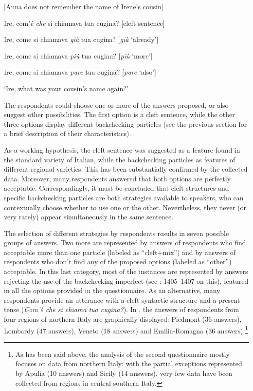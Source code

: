   [Anna does not remember the name of Irene’s cousin]

Ire, com’\textit{è che} si chiamava tua cugina?   [cleft sentence]

 Ire, come si chiamava \textit{già} tua cugina?    [\textit{già} ‘already’]

 Ire, come si chiamava \textit{più} tua cugina?   [\textit{più} ‘more’]

 Ire, come si chiamava \textit{pure} tua cugina?   [\textit{pure} ‘also’]

\glt ‘Ire, what was your cousin’s name again?’
    \z %

The respondents could choose one or more of the answers proposed, or also suggest other possibilities. The first option is a cleft sentence, while the other three options display different backchecking particles (see the previous section for a brief description of their characteristics).

As a working hypothesis, the cleft sentence was suggested as a feature found in the standard variety of Italian, while the backchecking particles as features of different regional varieties. This has been substantially confirmed by the collected data. Moreover, many respondents answered that both options are perfectly acceptable. Correspondingly, it must be concluded that cleft structures and specific backchecking particles are both strategies available to speakers, who can contextually choose whether to use one or the other. Nevertheless, they never (or very rarely) appear simultaneously in the same sentence.

The selection of different strategies by respondents results in seven possible groups of answers. Two more are represented by answers of respondents who find acceptable more than one particle (labeled as “cleft+mix”) and by answers of respondents who don’t find any of the proposed options (labeled as “other”) acceptable. In this last category, most of the instances are represented by answers rejecting the use of the backchecking imperfect (see \citealt{Waltereit2001}: 1405–1407 on this), featured in all the options provided in the questionnaire. As an alternative, many respondents provide an utterance with a cleft syntactic structure and a present tense (\textit{Com’è che si chiama tua cugina?}). In , the answers of respondents from four regions of northern Italy are graphically displayed: Piedmont (36 answers), Lombardy (47 answers), Veneto (18 answers) and Emilia-Romagna (36 answers).\footnote{As has been said above, the analysis of the second questionnaire mostly focuses on data from northern Italy: with the partial exceptions represented by Apulia (10 answers) and Sicily (14 answers), very few data have been collected from regions in central-southern Italy.}


